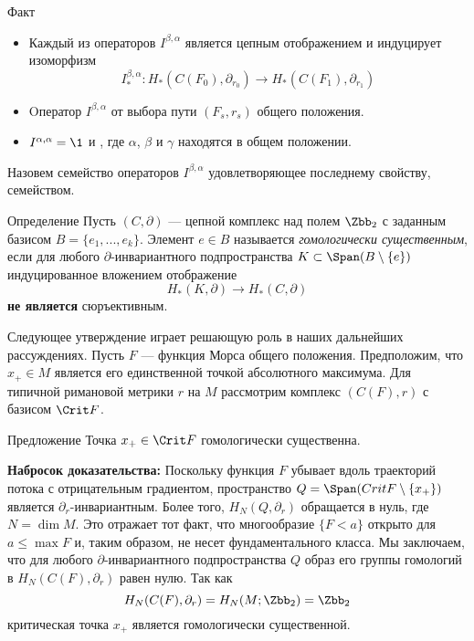 \begin{thm}{Факт}\label{13.2.E}
  \begin{itemize}
  \item
    Каждый из операторов $I^{\beta,\alpha}$ является цепным
    отображением и индуцирует изоморфизм
    \[
    I^{\beta,\alpha}_{*} :
    H_{*}(C(F_{0}),\partial_{r_{0}}) \to
    H_{*}(C(F_{1}),\partial_{r_{1}})
    \]
  \item
    Oператор $I^{\beta,\alpha}$ 
    от выбора пути $(F_{s},r_{s})$ общего положения.
  \item
    $I^{\alpha,\alpha}=\1$ и , где $\alpha$, $\beta$ и
    $\gamma$ находятся в общем положении.
  \end{itemize}
\end{thm}

Назовем семейство операторов $I^{\beta,\alpha}$ удовлетворяющее
последнему свойству,  семейством. 

\begin{ex}{Определение}\label{13.2.F}
Пусть $(C, \partial)$ --- цепной комплекс над полем $\Zbb_{2}$ с заданным базисом $B = \{e_{1},...,e_{k}\}$.
Элемент $e\in B$ называется \emph{гомологически существенным}, если для
любого $\partial$-инвариантного подпространства $K\subset \Span(B\setminus \{e\})$ индуцированное вложением отображение
\[
H_{*}(K,\partial)\to H_{*}(C,\partial)
\]
\textbf{не является} сюръективным.
\end{ex}

Следующее утверждение играет решающую роль в наших дальнейших рассуждениях.
Пусть $F$ — функция Морса общего положения.
Предположим, что $x_{+}\in M$ является его единственной точкой
абсолютного максимума. 
Для типичной римановой метрики $r$ на $M$ рассмотрим комплекс
$(C(F),r)$ с базисом $\Crit F$. 

\begin{thm}{Предложение}\label{13.2.G}
  Точка $x_{+}\in\Crit F$ гомологически существенна.  
\end{thm}

\noindent\textbf{Набросок доказательства:} Поскольку функция $F$
убывает вдоль траекторий потока с отрицательным градиентом,
пространство
$Q = \Span( Crit F \setminus \{x_{+}\})$ является $\partial_{r}$-инвариантным.
Более того, $H_{N}(Q,\partial_{r})$ обращается в нуль, где $N = \dim M$.
Это отражает тот факт, что многообразие $\{F<a\}$ открыто для $a\leq
\max F$ и, таким образом, не несет фундаментального класса. 
Мы заключаем, что для любого $\partial$-инвариантного подпространства
$Q$ образ его группы гомологий в $H_{N}(C(F),\partial_{r})$ равен
нулю. Так как
\[
H_{N}(C(F),\partial_{r})=H_{N}(M;\Zbb_{2})=\Zbb_{2}
\]
критическая точка $x_{+}$ является гомологически существенной.
\qeds

